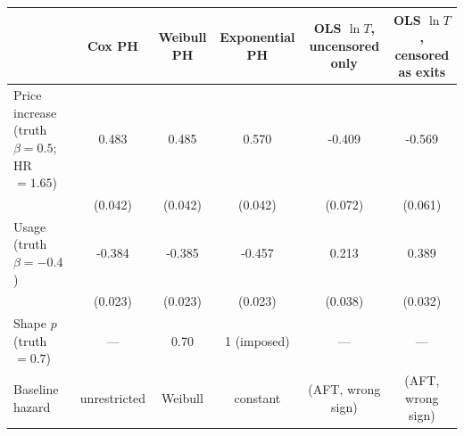 \begin{tabular}{lccccc}\toprule
 & Cox PH & Weibull PH & Exponential PH & OLS $\ln T$, uncensored only & OLS $\ln T$, censored as exits \\ \midrule
Price increase (truth $\beta = 0.5$; HR $= 1.65$) & 0.483 & 0.485 & 0.570 & -0.409 & -0.569 \\
 & (0.042) & (0.042) & (0.042) & (0.072) & (0.061) \\
Usage (truth $\beta = -0.4$) & -0.384 & -0.385 & -0.457 & 0.213 & 0.389 \\
 & (0.023) & (0.023) & (0.023) & (0.038) & (0.032) \\
Shape $p$ (truth $= 0.7$) & --- & 0.70 & 1 (imposed) & --- & --- \\
Baseline hazard & unrestricted & Weibull & constant & (AFT, wrong sign) & (AFT, wrong sign) \\
\bottomrule\end{tabular}
